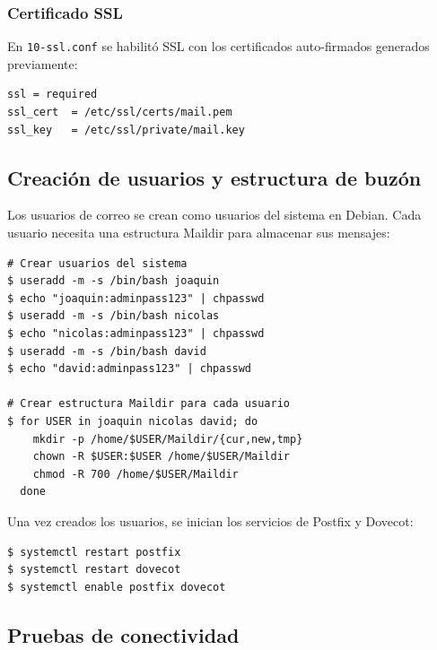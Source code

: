 \subsubsection{Certificado SSL}

En \texttt{10-ssl.conf} se habilitó SSL con los certificados auto-firmados
generados previamente:

\begin{lstlisting}[style=terminal]
ssl = required
ssl_cert  = /etc/ssl/certs/mail.pem
ssl_key   = /etc/ssl/private/mail.key
\end{lstlisting}


\subsection{Creación de usuarios y estructura de buzón}

Los usuarios de correo se crean como usuarios del sistema en Debian. Cada
usuario necesita una estructura Maildir para almacenar sus mensajes:

\begin{lstlisting}[style=terminal]
# Crear usuarios del sistema
$ useradd -m -s /bin/bash joaquin
$ echo "joaquin:adminpass123" | chpasswd
$ useradd -m -s /bin/bash nicolas
$ echo "nicolas:adminpass123" | chpasswd
$ useradd -m -s /bin/bash david
$ echo "david:adminpass123" | chpasswd

# Crear estructura Maildir para cada usuario
$ for USER in joaquin nicolas david; do
    mkdir -p /home/$USER/Maildir/{cur,new,tmp}
    chown -R $USER:$USER /home/$USER/Maildir
    chmod -R 700 /home/$USER/Maildir
  done
\end{lstlisting}

Una vez creados los usuarios, se inician los servicios de Postfix y Dovecot:

\begin{lstlisting}[style=terminal]
$ systemctl restart postfix
$ systemctl restart dovecot
$ systemctl enable postfix dovecot
\end{lstlisting}

\subsection{Pruebas de conectividad}

